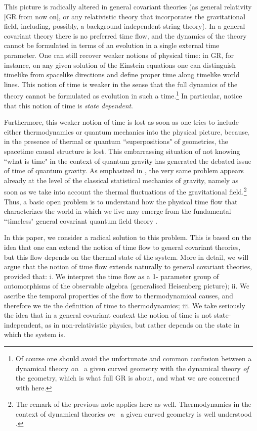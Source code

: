 This picture is radically altered in general covariant theories (as
general relativity [GR from now on], or any relativistic theory
that incorporates the gravitational field, including, possibly, a
background independent string theory).  In a general covariant
theory there is no preferred time flow, and the dynamics of the
theory cannot be formulated in terms of an evolution in a single
external time parameter.   One can still recover weaker notions of
physical time:  in GR, for instance, on any given solution of the
Einstein equations one can distinguish timelike from spacelike
directions and define proper time along timelike world lines.
This notion of time is weaker in the sense that the full dynamics
of the theory cannot be formulated as evolution in such a
time.\footnote{Of course one should avoid the unfortunate and
common confusion between a dynamical theory {\it on\ } a given
curved geometry with the dynamical theory {\it of\ } the
geometry, which is what full GR is about, and what we are
concerned with here.}    In particular, notice that this notion of
time is {\it state dependent}.

Furthermore, this weaker notion of time is lost as soon as one
tries to include either thermodynamics or quantum mechanics
into the physical picture, because, in the presence of thermal or
quantum ``superpositions" of geometries, the spacetime causal
structure is lost.  This embarrassing situation of not knowing
``what is time" in the context of quantum gravity has generated
the debated issue of time of quantum gravity.   As emphasized in
\cite{statistical}, the very same problem appears already at the
level of the classical statistical mechanics of gravity, namely as
soon as we take into account the thermal fluctuations of the
gravitational field.\footnote{The remark of the previous note
applies here as well. Thermodynamics in the context of dynamical
theories {\it on\ } a given curved geometry is well understood
\cite{tolman}.}   Thus, a basic open problem is to understand how
the physical time flow that characterizes the world in which we
live may emerge from the fundamental ``timeless" general
covariant quantum field theory \cite{abhaylh}.

In this paper, we consider a radical solution to this problem. This
is based on the idea that one can extend the notion of time flow
to general covariant theories, but this flow depends on the
thermal state of the system.   More in detail, we will argue that
the notion of time flow extends naturally to general covariant
theories, provided that: i. We interpret the time flow as a 1-
parameter group of automorphisms of the observable algebra
(generalised Heisenberg picture); ii. We ascribe the temporal
properties of the flow to thermodynamical causes, and therefore
we tie the definition of time to thermodynamics; iii. We take
seriously the idea that in a general covariant context the notion
of time is not state-independent, as in non-relativistic physics,
but rather depends on the state in which the system is.


